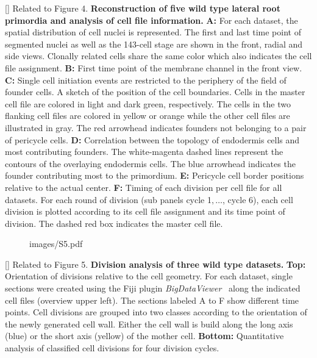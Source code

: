 []{
Related to Figure 4.
{\bf Reconstruction of five wild type lateral root primordia and analysis of cell file information.} {\bf A:} For each dataset, the spatial distribution of cell nuclei is represented. The first and last time point of segmented nuclei as well as the 143-cell stage are shown in the front, radial and side views. Clonally related cells share the same color which also indicates the cell file assignment. {\bf B:} First time point of the membrane channel in the front view. {\bf C:} Single cell initiation events are restricted to the periphery of the field of founder cells. A sketch of the position of the cell boundaries. Cells in the master cell file are colored in light and dark green, respectively. The cells in the two flanking cell files are colored in yellow or orange while the other cell files are illustrated in gray. The red arrowhead indicates founders not belonging to a pair of pericycle cells. {\bf D:} Correlation between the topology of endodermis cells and most contributing founders. The white-magenta dashed lines represent the contours of the overlaying endodermis cells. The blue arrowhead indicates the founder contributing most to the primordium. {\bf E:} Pericycle cell border positions relative to the actual center. {\bf F:} Timing of each division per cell file for all datasets. For each round of division (sub panels cycle 1$, \ldots$, cycle 6), each cell division is plotted according to its cell file assignment and its time point of division. The dashed red box indicates the master cell file.
}
\label{fig:S4}
%
\clearpage
%
\begin{figure}[htbp]
\centering
	\begin{overpic}[width=1.\linewidth]{images/S5.pdf}
	\end{overpic}
\end{figure}
\clearpage
{}[]{
Related to Figure 5.
{\bf Division analysis of three wild type datasets.} {\bf Top:} Orientation of divisions relative to the cell geometry. For each dataset, single sections were created using the Fiji plugin \textit{BigDataViewer}~\cite{Pietzsch_et_al_2015} along the indicated cell files (overview upper left). The sections labeled A to F show different time points. Cell divisions are grouped into two classes according to the orientation of the newly generated cell wall. Either the cell wall is build along the long axis (blue) or the short axis (yellow) of the mother cell. {\bf Bottom:} Quantitative analysis of classified cell divisions for four division cycles.
}
\label{fig:S5}
%
\clearpage
